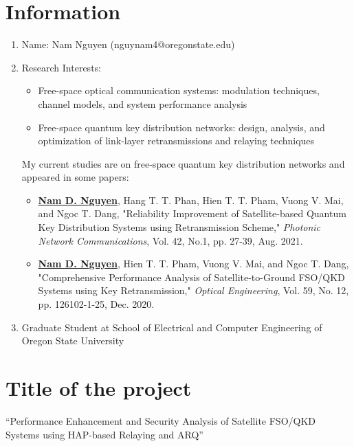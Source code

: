 \documentclass[12pt,onecolumn,letterpaper]{IEEEtran}
\begin{document}
\section{Information}
\begin{enumerate}
\item Name: Nam Nguyen (nguynam4@oregonstate.edu)
\item Research Interests:
	\begin{itemize}
	\item Free-space optical communication systems: modulation techniques, channel models, and system performance
analysis

	\item Free-space quantum key distribution networks: design, analysis, and optimization of link-layer retransmissions
and relaying techniques

	\end{itemize}
	
My current studies are on free-space quantum key distribution networks and appeared in some papers:

\begin{itemize}
\item \underline{\textbf{Nam D. Nguyen}}, Hang T. T. Phan, Hien T. T. Pham, Vuong V. Mai, and Ngoc T. Dang, \textcolor[rgb]{0,0,0.45}{"Reliability Improvement of Satellite-based Quantum Key Distribution Systems using Retransmission Scheme,"} \textit{Photonic Network Communications}, Vol. 42, No.1, pp. 27-39, Aug. 2021.

\item \underline{\textbf{Nam D. Nguyen}}, Hien T. T. Pham, Vuong V. Mai, and Ngoc T. Dang, \textcolor[rgb]{0,0,0.45}{"Comprehensive Performance Analysis of Satellite-to-Ground FSO/QKD Systems using Key Retransmission,"} \textit{Optical Engineering}, Vol. 59, No. 12, pp. 126102-1-25, Dec. 2020.

\end{itemize}

\item Graduate Student at School of Electrical and Computer Engineering of Oregon State University

\end{enumerate}

\section{Title of the project}
{\bf
\begin{center}
\enquote{Performance Enhancement and Security Analysis of Satellite FSO/QKD Systems using HAP-based Relaying and ARQ}
\end{center}
}
\end{document}
